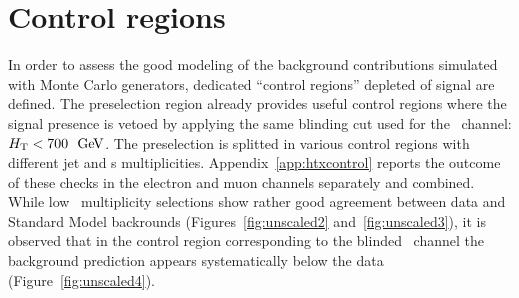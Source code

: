 \section{Control regions}\label{sec:htxCR}

In order to assess the good modeling of the background contributions
simulated with Monte Carlo generators, dedicated ``control regions''
depleted of signal are defined. The preselection region already provides
useful control regions where the signal presence is vetoed by applying the
same blinding cut used for the \chii\ channel: $\HT < 700~\gev$.
The preselection is splitted in various control regions with different
jet and \bjet s multiplicities. Appendix~\ref{app:htxcontrol} reports
the outcome of these checks in the electron and muon channels separately
and combined. While low \bjet\ multiplicity selections show rather good
agreement between data and Standard Model backrounds (Figures~\ref{fig:unscaled2}
and~\ref{fig:unscaled3}), it is observed that
in the control region corresponding to the blinded \chiv\ channel
the background prediction appears systematically below the data 
(Figure~\ref{fig:unscaled4}).

